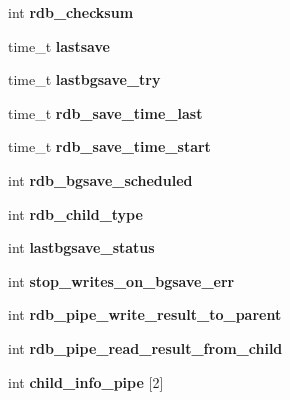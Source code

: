 \begin{DoxyCompactItemize}
int {\bfseries rdb\+\_\+checksum}
\item 
\mbox{\label{structredisServer_a16b8cdf645dd6a74c7b3e027f301fe1c}} 
time\+\_\+t {\bfseries lastsave}
\item 
\mbox{\label{structredisServer_a5f0a19f59dd1c0d15184d306166f452b}} 
time\+\_\+t {\bfseries lastbgsave\+\_\+try}
\item 
\mbox{\label{structredisServer_a44cfdba69d90b313127c9e6b5c8d65b3}} 
time\+\_\+t {\bfseries rdb\+\_\+save\+\_\+time\+\_\+last}
\item 
\mbox{\label{structredisServer_ad40e584c0853ff155e0a2d7255fd4662}} 
time\+\_\+t {\bfseries rdb\+\_\+save\+\_\+time\+\_\+start}
\item 
\mbox{\label{structredisServer_a2ed01331c297857b0af9754c62fad8d7}} 
int {\bfseries rdb\+\_\+bgsave\+\_\+scheduled}
\item 
\mbox{\label{structredisServer_a78db06fa0584c88619d7d2cdd11eb0d8}} 
int {\bfseries rdb\+\_\+child\+\_\+type}
\item 
\mbox{\label{structredisServer_a35f5e0fbbdebcfa88a0789b392574a6d}} 
int {\bfseries lastbgsave\+\_\+status}
\item 
\mbox{\label{structredisServer_ad2a4a2804e93e9110ea191c1c7a8cafc}} 
int {\bfseries stop\+\_\+writes\+\_\+on\+\_\+bgsave\+\_\+err}
\item 
\mbox{\label{structredisServer_ae0670e64a4880c6652d8b8e7c3dcc19e}} 
int {\bfseries rdb\+\_\+pipe\+\_\+write\+\_\+result\+\_\+to\+\_\+parent}
\item 
\mbox{\label{structredisServer_a8bb85988fc1bfa0801ff8b38d4dbdd5d}} 
int {\bfseries rdb\+\_\+pipe\+\_\+read\+\_\+result\+\_\+from\+\_\+child}
\item 
\mbox{\label{structredisServer_a2b9b7cf47209653bdcecc638156ed603}} 
int {\bfseries child\+\_\+info\+\_\+pipe} \mbox{[}2\mbox{]}

\end{DoxyCompactItemize}
